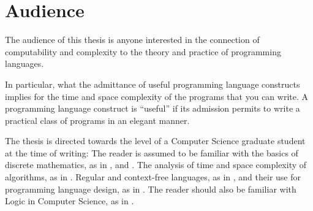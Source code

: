 \section{Audience} \label{sec:introduction:audience}

The audience of this thesis is anyone interested in the connection of
computability and complexity to the theory and practice of programming
languages.

In particular, what the admittance of useful programming language constructs
implies for the time and space complexity of the programs that you can write. A
programming language construct is ``useful'' if its admission permits to write
a practical class of programs in an elegant manner.

The thesis is directed towards the level of a Computer Science graduate student
at the time of writing: The reader is assumed to be familiar with the basics of
discrete mathematics, as in \cite[\ch~0]{sipser-2013}, and \cite[Appendixes A,
B, and C]{cormen-et-al-2009}. The analysis of time and space complexity of
algorithms, as in \cite[\chs~1--17 and \chs~21--24]{cormen-et-al-2009}. Regular
and context-free languages, as in \cite[\chs~1--2]{sipser-2013}, and their use
for programming language design, as in \cite{mogensen-2010}. The reader should
also be familiar with Logic in Computer Science, as in
\cite[\chs~1--4]{huth-ryan-2004}.
